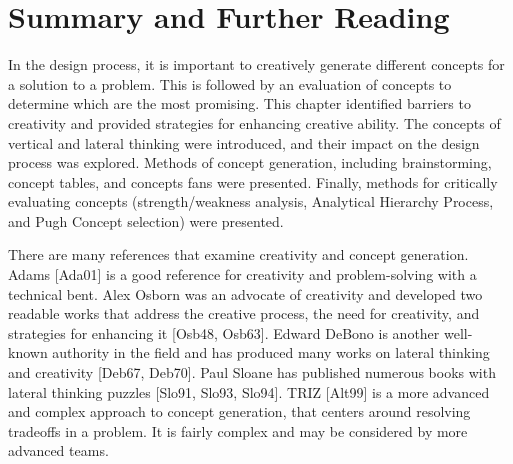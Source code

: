\section{Summary and Further Reading}
\label{section:summary-and-further-reading}

In the design process, it is important to creatively generate different
concepts for a solution to a problem. This is followed by an evaluation
of concepts to determine which are the most promising. This chapter
identified barriers to creativity and provided strategies for enhancing
creative ability. The concepts of vertical and lateral thinking were
introduced, and their im­pact on the design process was explored. Methods
of concept generation, including brainstorming, concept tables, and
concepts fans were presented. Finally, methods for critically evaluating
concepts (strength/weakness analysis, Analytical Hierarchy Process, and
Pugh Concept selection) were presented.

There are many references that examine creativity and concept
generation. Adams {[}Ada01{]} is a good reference for creativity and
problem-solving with a technical bent. Alex Os­born was an advocate of
creativity and developed two readable works that address the creative
process, the need for creativity, and strategies for enhancing it
{[}Osb48, Osb63{]}. Ed­ward DeBono is another well-known authority in the
field and has produced many works on lateral thinking and creativity
{[}Deb67, Deb70{]}. Paul Sloane has published numerous books with
lateral thinking puzzles {[}Slo91, Slo93, Slo94{]}. TRIZ {[}Alt99{]} is
a more advanced and complex approach to concept generation, that centers
around resolving tradeoffs in a problem. It is fairly complex and may be
considered by more advanced teams.
